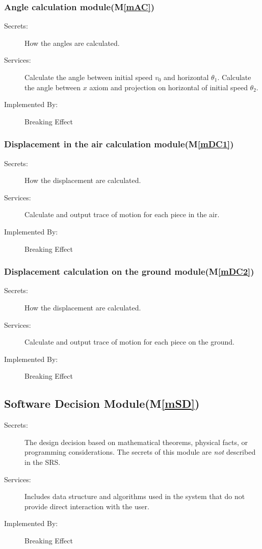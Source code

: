 \documentclass[12pt, titlepage]{article}
\newcommand{\mref}[1]{M\ref{#1}}
\begin{document}
	\subsubsection{Angle calculation module(\mref{mAC})}
	
	\begin{description}
		\item[Secrets:]How the angles are calculated.
		\item[Services:]Calculate the angle between initial speed $v_{0}$ and horizontal $\theta_{1}$. Calculate the angle between $x$ axiom and projection on horizontal of initial speed $\theta_{2}$.
		\item[Implemented By:] Breaking Effect
	\end{description}

	\subsubsection{Displacement in the air calculation module(\mref{mDC1})}
	
	\begin{description}
		\item[Secrets:]How the displacement are calculated.
		\item[Services:]Calculate and output trace of motion for each piece in the air.
		\item[Implemented By:] Breaking Effect
	\end{description}
	
	\subsubsection{Displacement calculation on the ground module(\mref{mDC2})}
	
	\begin{description}
		\item[Secrets:]How the displacement are calculated.
		\item[Services:]Calculate and output trace of motion for each piece on the ground.
		\item[Implemented By:] Breaking Effect
	\end{description}
	
	\subsection{Software Decision Module(\mref{mSD})}
	
	\begin{description}
		\item[Secrets:] The design decision based on mathematical theorems, physical
		facts, or programming considerations. The secrets of this module are
		\emph{not} described in the SRS.
		\item[Services:] Includes data structure and algorithms used in the system that
		do not provide direct interaction with the user. 
		\item[Implemented By:] Breaking Effect
	\end{description}
	
\end{document}
